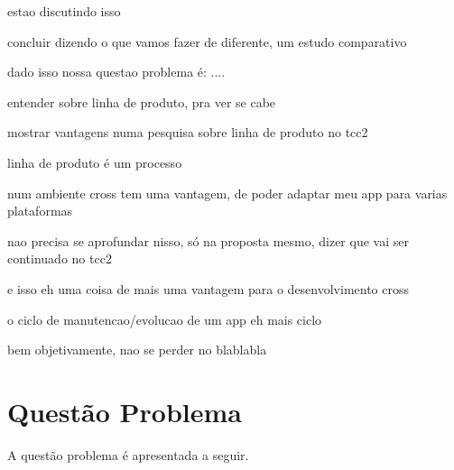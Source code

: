 estao discutindo isso

concluir dizendo o que vamos fazer de diferente, um estudo comparativo

dado isso nossa questao problema é: ....

entender sobre linha de produto, pra ver se cabe

mostrar vantagens numa pesquisa sobre linha de produto no tcc2

linha de produto é um processo

num ambiente cross tem uma vantagem, de poder adaptar meu app para varias plataformas

nao precisa se aprofundar nisso, só na proposta mesmo, dizer que vai ser continuado no tcc2

e isso eh uma coisa de mais uma vantagem para o desenvolvimento cross

o ciclo de manutencao/evolucao de um app eh mais ciclo

bem objetivamente, nao se perder no blablabla

 
\section{Questão Problema} \label{subsec:hipoteses}

A questão problema é apresentada a seguir.

